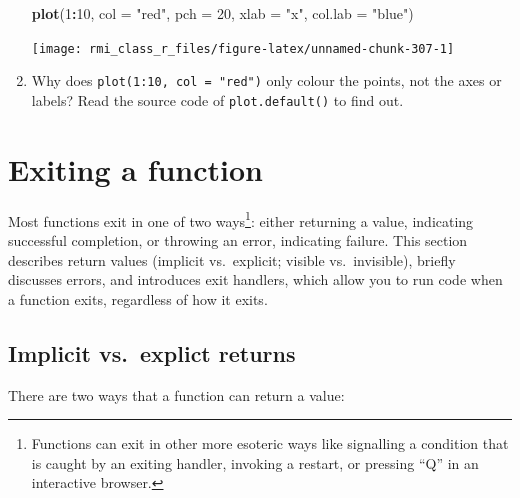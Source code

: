 \documentclass[]{book}
\newenvironment{Shaded}{\begin{snugshade}}{\end{snugshade}}
\newcommand{\DataTypeTok}[1]{\textcolor[rgb]{0.13,0.29,0.53}{#1}}
\newcommand{\DecValTok}[1]{\textcolor[rgb]{0.00,0.00,0.81}{#1}}
\newcommand{\KeywordTok}[1]{\textcolor[rgb]{0.13,0.29,0.53}{\textbf{#1}}}
\newcommand{\NormalTok}[1]{#1}
\newcommand{\OperatorTok}[1]{\textcolor[rgb]{0.81,0.36,0.00}{\textbf{#1}}}
\newcommand{\StringTok}[1]{\textcolor[rgb]{0.31,0.60,0.02}{#1}}
\let\rmarkdownfootnote\footnote%
\def\footnote{\protect\rmarkdownfootnote}
\theoremstyle{definition}
\theoremstyle{definition}
\theoremstyle{definition}
\theoremstyle{remark}
\begin{document}
\begin{enumerate}
\begin{Shaded}
\begin{Highlighting}[]
\KeywordTok{plot}\NormalTok{(}\DecValTok{1}\OperatorTok{:}\DecValTok{10}\NormalTok{, }\DataTypeTok{col =} \StringTok{"red"}\NormalTok{, }\DataTypeTok{pch =} \DecValTok{20}\NormalTok{, }\DataTypeTok{xlab =} \StringTok{"x"}\NormalTok{, }\DataTypeTok{col.lab =} \StringTok{"blue"}\NormalTok{)}
\end{Highlighting}
\end{Shaded}

  \begin{center}\texttt{[image: rmi\_class\_r\_files/figure-latex/unnamed-chunk-307-1]} \end{center}
\item
  Why does \texttt{plot(1:10,\ col\ =\ "red")} only colour the points,
  not the axes or labels? Read the source code of
  \texttt{plot.default()} to find out.
\end{enumerate}

\hypertarget{exiting-a-function}{%
\section{Exiting a function}\label{exiting-a-function}}

Most functions exit in one of two ways\footnote{Functions can exit in
  other more esoteric ways like signalling a condition that is caught by
  an exiting handler, invoking a restart, or pressing ``Q'' in an
  interactive browser.}: either returning a value, indicating successful
completion, or throwing an error, indicating failure. This section
describes return values (implicit vs.~explicit; visible vs.~invisible),
briefly discusses errors, and introduces exit handlers, which allow you
to run code when a function exits, regardless of how it exits.

\hypertarget{implicit-vs.explict-returns}{%
\subsection{Implicit vs.~explict
returns}\label{implicit-vs.explict-returns}}

There are two ways that a function can return a value:
\end{document}
